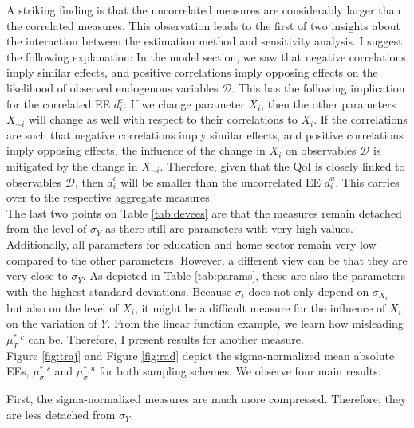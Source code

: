 \documentclass[a4paper,12pt]{article}
\begin{document}
\noindent
A striking finding is that the uncorrelated measures are considerably larger than the correlated measures. This observation leads to the first of two insights about the interaction between the estimation method and sensitivity analysis. I suggest the following explanation: In the model section, we saw that negative correlations imply similar effects, and positive correlations imply opposing effects on the likelihood of observed endogenous variables $\pmb{\mathcal{D}}$. This has the following implication for the correlated EE $d_i^{c}$: If we change parameter $X_i$, then the other parameters $X_{\sim i}$ will change as well with respect to their correlations to $X_i$. If the correlations are such that negative correlations imply similar effects, and positive correlations imply opposing effects, the influence of the change in $X_i$ on observables $\pmb{\mathcal{D}}$ is mitigated by the change in $X_{\sim i}$. Therefore, given that the QoI is closely linked to observables $\pmb{\mathcal{D}}$, then $d_i^{c}$ will be smaller than the uncorrelated EE $d_i^{u}$. This carries over to the respective aggregate measures.\\

\noindent
The last two points on Table \ref{tab:devees} are that the measures remain detached from the level of $\sigma_Y$ as there still are parameters with very high values. Additionally, all parameters for education and home sector remain very low compared to the other parameters. However, a different view can be that they are very close to $\sigma_Y$. As depicted in Table \ref{tab:params}, these are also the parameters with the highest standard deviations. Because $\sigma_i$ does not only depend on $\sigma_{X_i}$ but also on the level of $X_i$, it might be a difficult measure for the influence of $X_i$ on the variation of $Y$. From the linear function example, we learn how misleading $\mu^{*,c}_T$ can be. Therefore, I present results for another measure.\\


\noindent
Figure \ref{fig:traj} and Figure \ref{fig:rad} depict the sigma-normalized mean absolute EEs, $\mu^{*,c}_{\sigma}$ and $\mu^{*,u}_{\sigma}$ for both sampling schemes. We observe four main results:

First, the sigma-normalized measures are much more compressed. Therefore, they are less detached from $\sigma_Y$.
\end{document}
